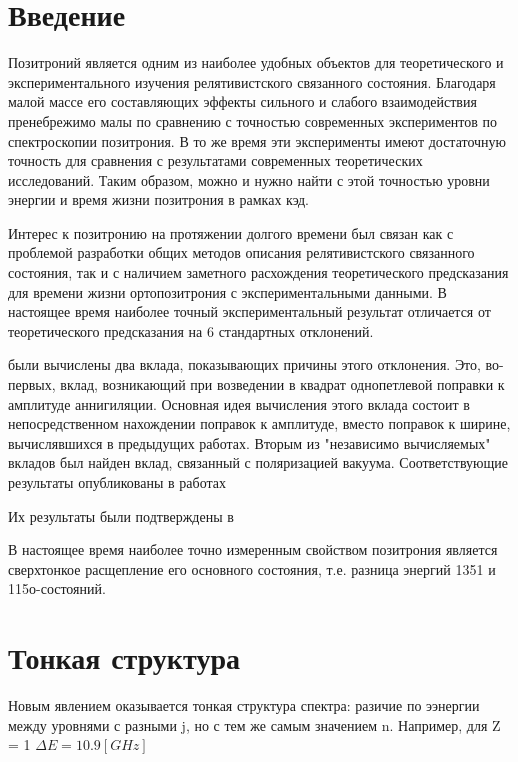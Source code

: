 \documentclass[a4paper,14pt,russian]{article}
\begin{document}
\section {Введение}

Позитроний является одним из наиболее удобных объектов для теоретического и экспериментального изучения релятивистского связанного состояния. Благодаря малой массе его составляющих эффекты сильного и слабого взаимодействия пренебрежимо малы по сравнению с точностью современных экспериментов по спектроскопии позитрония. В то же время эти эксперименты имеют достаточную точность для сравнения с результатами современных теоретических исследований. Таким образом, можно и нужно найти с этой точностью уровни энергии и время жизни позитрония в рамках кэд.

Интерес к позитронию на протяжении долгого времени был связан как с проблемой разработки общих методов описания релятивистского связанного состояния, так и с наличием заметного расхождения теоретического предсказания для времени жизни ортопозитрония с экспериментальными данными. В настоящее время наиболее точный экспериментальный результат отличается от теоретического предсказания на 6 стандартных отклонений.

были вычислены \cite{a} два вклада, показывающих причины этого отклонения. Это, во-первых, вклад, возникающий при возведении в квадрат однопетлевой поправки к амплитуде аннигиляции. Основная идея вычисления этого вклада состоит в непосредственном нахождении поправок к амплитуде, вместо поправок к ширине, вычислявшихся в предыдущих работах. Вторым из "независимо вычисляемых" вкладов был найден вклад, связанный с поляризацией вакуума. Соответствующие результаты опубликованы в работах \cite{b} \cite{c}

Их результаты были подтверждены в \cite{d} \cite{e}

В настоящее время наиболее точно измеренным свойством позитрония является сверхтонкое расщепление его основного состояния, т.е. разница энергий 1351 и 115о-состояний. 

\newpage

\section{Тонкая структура}

Новым явлением оказывается тонкая структура спектра: разичие по ээнергии между уровнями с разными j, но с тем же самым значением n. Например, для Z = 1 $\Delta E = 10.9 [GHz]$
\end{document}
